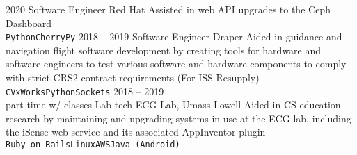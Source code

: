 \documentclass[9pt]{developercv} %
\begin{document}
\vspace{0.5cm}




\begin{entrylist}
	\entry
		{2020}
		{Software Engineer}
		{Red Hat}
		{Assisted in web API upgrades to the Ceph Dashboard\\
        \texttt{Python}\slashsep\texttt{CherryPy}}
	\entry
		{2018 -- 2019}
		{Software Engineer}
		{Draper}
		{Aided in guidance and navigation flight software development by creating
        tools for hardware and software engineers to test various software and
        hardware components to comply with strict CRS2 contract requirements (For ISS Resupply)\\
        \texttt{C}\slashsep\texttt{VxWorks}\slashsep\texttt{Python}\slashsep\texttt{Sockets}}
	\entry
		{2018 -- 2019\\\footnotesize{part time w/ classes}}
		{Lab tech}
        {ECG Lab, Umass Lowell}
		{Aided in CS education research by maintaining and upgrading systems in use at the ECG lab,
        including the iSense web service and its associated AppInventor plugin\\
        \texttt{Ruby on Rails}\slashsep\texttt{Linux}\slashsep\texttt{AWS}\slashsep\texttt{Java (Android)}}
\end{entrylist}
\end{document}
